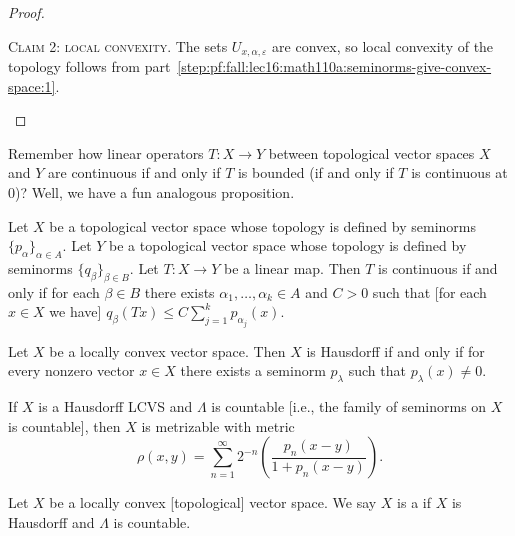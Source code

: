 \begin{framed}
\begin{proof}
\begin{enumerate}
  \textsc{Claim 2: local convexity}.
  The sets $U_{x,\alpha,\varepsilon}$ are convex, so local convexity of
the topology follows from part~\ref{step:pf:fall:lec16:math110a:seminorms-give-convex-space:1}.\qedhere
\end{enumerate}
\end{proof}

Remember how linear operators $T\colon X\to Y$ between topological
vector spaces $X$ and $Y$ are continuous if and only if $T$ is bounded
(if and only if $T$ is continuous at $0$)? Well, we have a fun
analogous proposition.

\begin{proposition}
Let $X$ be a topological vector space whose topology is defined by
seminorms $\{p_{\alpha}\}_{\alpha\in A}$.
Let $Y$ be a topological vector space whose topology is defined by
seminorms $\{q_{\beta}\}_{\beta\in B}$.
Let $T\colon X\to Y$ be a linear map.
Then $T$ is continuous if and only if for each $\beta\in B$ there
exists $\alpha_{1},\dots,\alpha_{k}\in A$ and $C>0$ such that [for
each $x\in X$ we have]
$q_{\beta}(Tx)\leq C\sum^{k}_{j=1}p_{\alpha_{j}}(x)$.
\end{proposition}
\end{framed}

\begin{fact}
  Let $X$ be a locally convex vector space.
  Then $X$ is Hausdorff if and only if for every nonzero vector $x\in X$
  there exists  a seminorm $p_{\lambda}$ such that $p_{\lambda}(x)\neq0$.
\end{fact}

\begin{fact}
If $X$ is a Hausdorff LCVS and $\Lambda$ is countable [i.e., the
  family of seminorms on $X$ is countable], then $X$ is metrizable
with metric
\begin{equation}
\rho(x,y)=\sum^{\infty}_{n=1}2^{-n}\left(\frac{p_{n}(x-y)}{1+p_{n}(x-y)}\right).
\end{equation}
\end{fact}

\begin{definition}
Let $X$ be a locally convex [topological] vector space.
We say $X$ is a  if $X$ is Hausdorff and
$\Lambda$ is countable.
\end{definition}

